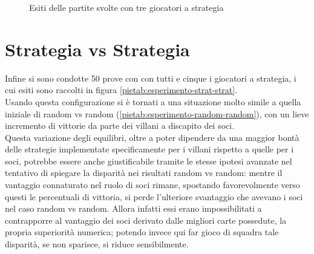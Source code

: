\begin{figure}[!htb]
\label{piech:ultimo-vill}
\caption{Esiti delle partite svolte con tre giocatori a strategia}
\end{figure}












\section{Strategia vs Strategia}

Infine si sono condotte 50 prove con con tutti e cinque i giocatori a strategia, i cui esiti sono raccolti in figura \ref{pietab:esperimento-strat-strat}.\\
Usando questa configurazione si è tornati a una situazione molto simile a quella iniziale di random vs random (\ref{pietab:esperimento-random-random}), con un lieve incremento di vittorie da parte dei villani a discapito dei soci.\\
Questa variazione degli equilibri, oltre a poter dipendere da una maggior bontà delle strategie implementate specificamente per i villani rispetto a quelle per i soci, potrebbe essere anche giustificabile tramite le stesse ipotesi avanzate nel tentativo di spiegare la disparità nei risultati random vs random: mentre il vantaggio connaturato nel ruolo di soci rimane, spostando favorevolmente verso questi le percentuali di vittoria, si perde l'ulteriore svantaggio che avevano i soci nel caso random vs random.
Allora infatti essi erano impossibilitati a contrapporre al vantaggio dei soci derivato dalle migliori carte possedute, la propria superiorità numerica; potendo invece qui far gioco di squadra tale disparità, se non sparisce, si riduce sensibilmente.


